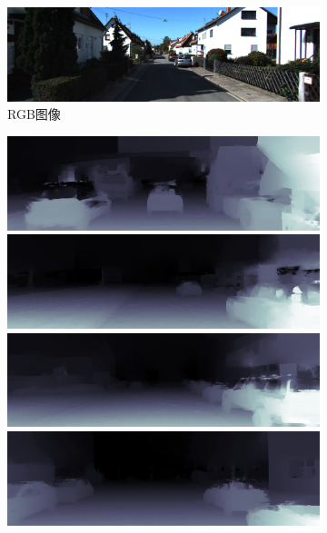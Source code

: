 \begin{figure}[htb]
\begin{subfigure}{0.15\linewidth}
\begin{minipage}[b]{1\linewidth}
  \includegraphics[width=1\linewidth]{figure/kitti_rgb/0000000642.png}
  \end{minipage}
  \caption{RGB图像}
  \end{subfigure}
  \begin{subfigure}{0.15\linewidth}
  \begin{minipage}[b]{1\linewidth}
  \includegraphics[width=1\linewidth]{figure/kitti_gt/26_52_00.png}\vspace{4pt}
  \includegraphics[width=1\linewidth]{figure/kitti_gt/26_13_35.png}\vspace{4pt}
  \includegraphics[width=1\linewidth]{figure/kitti_gt/26_09_260.png}\vspace{4pt}
  \includegraphics[width=1\linewidth]{figure/kitti_gt/26_09_340.png}\vspace{4pt}

\end{minipage}
\end{subfigure}
\end{figure}
